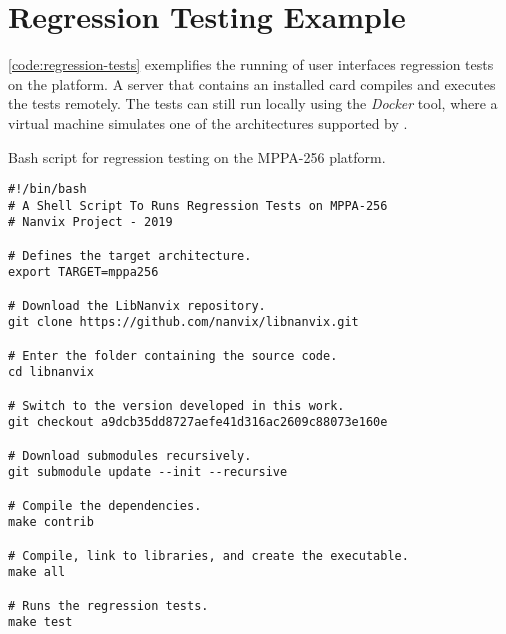 

\section{Regression Testing Example}
\label{sec:code-example}

	\autoref{code:regression-tests} exemplifies the running of user interfaces
	regression tests on the \mppa platform. A server that contains an installed
	\mppa card compiles and executes the tests remotely. The tests can still
	run locally using the \textit{Docker} tool, where a virtual machine
	simulates one of the architectures supported by \nanvixos.

\begin{listing}[!hb]
\caption{Bash script for regression testing on the MPPA-256 platform.}
\label{code:regression-tests}
\begin{verbatim}
#!/bin/bash
# A Shell Script To Runs Regression Tests on MPPA-256
# Nanvix Project - 2019

# Defines the target architecture.
export TARGET=mppa256

# Download the LibNanvix repository.
git clone https://github.com/nanvix/libnanvix.git

# Enter the folder containing the source code.
cd libnanvix

# Switch to the version developed in this work.
git checkout a9dcb35dd8727aefe41d316ac2609c88073e160e

# Download submodules recursively.
git submodule update --init --recursive

# Compile the dependencies.
make contrib

# Compile, link to libraries, and create the executable.
make all

# Runs the regression tests.
make test
\end{verbatim}
\end{listing}